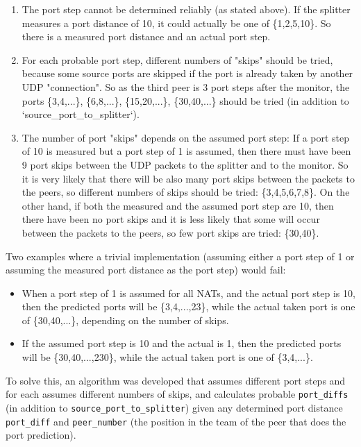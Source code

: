 \documentclass{article}
\begin{document}
\begin{enumerate}
\item The port step cannot be determined reliably (as stated above). If
   the splitter measures a port distance of 10, it could actually be
   one of \{1,2,5,10\}. So there is a measured port distance and an
   actual port step.

\item For each probable port step, different numbers of "skips" should be
   tried, because some source ports are skipped if the port is already
   taken by another UDP "connection". So as the third peer is 3 port
   steps after the monitor, the ports \{3,4,...\}, \{6,8,...\},
   \{15,20,...\}, \{30,40,...\} should be tried (in addition to
   `source_port_to_splitter`).

\item The number of port "skips" depends on the assumed port step: If a
   port step of 10 is measured but a port step of 1 is assumed, then
   there must have been 9 port skips between the UDP packets to the
   splitter and to the monitor. So it is very likely that there will
   be also many port skips between the packets to the peers, so
   different numbers of skips should be tried: \{3,4,5,6,7,8\}.  On the
   other hand, if both the measured and the assumed port step are 10,
   then there have been no port skips and it is less likely that some
   will occur between the packets to the peers, so few port skips are
   tried: \{30,40\}.
   
\end{enumerate}

Two examples where a trivial implementation (assuming either a port
step of 1 or assuming the measured port distance as the port step)
would fail:

\begin{itemize}

\item When a port step of 1 is assumed for all NATs, and the actual port
  step is 10, then the predicted ports will be \{3,4,...,23\}, while the
  actual taken port is one of \{30,40,...\}, depending on the number of
  skips.

\item If the assumed port step is 10 and the actual is 1, then the
  predicted ports will be \{30,40,...,230\}, while the actual taken port
  is one of \{3,4,...\}.

\end{itemize}

To solve this, an algorithm was developed that assumes different port
steps and for each assumes different numbers of skips, and calculates
probable \verb|port_diffs| (in addition
to \verb|source_port_to_splitter|) given any determined port distance
\verb|port_diff| and \verb|peer_number| (the position in the team of the peer
that does the port prediction).
\end{document}
